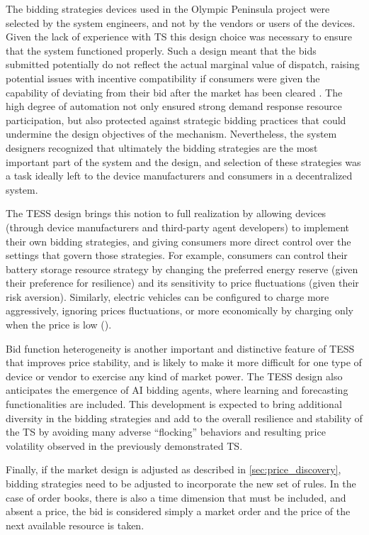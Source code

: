 The bidding strategies devices used in the Olympic Peninsula project were selected by the system engineers, and not by the vendors or users of the devices. Given the lack of experience with TS this design choice was necessary to ensure that the system functioned properly. 
Such a design meant that the bids submitted potentially do not reflect the actual marginal value of dispatch, raising potential issues with incentive compatibility if consumers were given the capability of deviating from their bid after the market has been cleared \citep{lian_transactive_2020}. 
The high degree of automation not only ensured strong demand response resource participation, but also protected against strategic bidding practices that could undermine the design objectives of the mechanism.
Nevertheless, the system designers recognized that ultimately the bidding strategies are the most important part of the system and the design, and selection of these strategies was a task ideally left to the device manufacturers and consumers in a decentralized system.

The TESS design brings this notion to full realization by allowing devices (through device manufacturers and third-party agent developers) to implement their own bidding strategies, and giving consumers more direct control over the settings that govern those strategies. For example, consumers can control their battery storage resource strategy by changing the preferred energy reserve (given their preference for resilience) and its sensitivity to price fluctuations (given their risk aversion).  Similarly, electric vehicles can be configured to charge more aggressively, ignoring prices fluctuations, or more economically by charging only when the price is low (\cite{behboodi2016electric}). 

Bid function heterogeneity is another important and distinctive feature of TESS that improves price stability, and is likely to make it more difficult for one type of device or vendor to exercise any kind of market power.
The TESS design also anticipates the emergence of AI bidding agents, where learning and forecasting functionalities are included. This development is expected to bring additional diversity in the bidding strategies and add to the overall resilience and stability of the TS by avoiding many adverse ``flocking'' behaviors and resulting price volatility observed in the previously demonstrated TS.

Finally, if the market design is adjusted as described in \cref{sec:price_discovery}, bidding strategies need to be adjusted to incorporate the new set of rules.
In the case of order books, there is also a time dimension that must be included, and absent a price, the bid is considered simply a market order and the price of the next available resource is taken.

